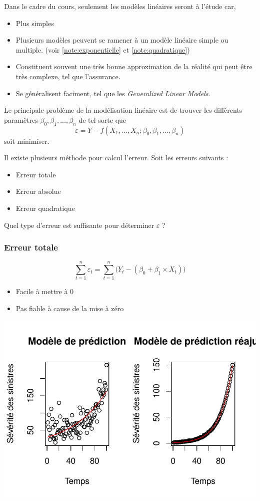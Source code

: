 \documentclass[11pt,french]{report}
\begin{document}
Dans le cadre du cours, seulement les modèles linéaires seront à l'étude car,

\begin{itemize}
\item Plus simples
\item Plusieurs modèles peuvent se ramener à un modèle linéaire simple ou multiple. (voir \ref{note:exponentielle} et \ref{note:quadratique})
\item Constituent souvent une très bonne approximation de la réalité qui peut être très complexe, tel que l'assurance.
\item Se généralisent faciment, tel que les \textit{Generalized Linear Models}.
\end{itemize}

Le principale problème de la modélisation linéaire est de trouver les différents paramètres $\beta_0, \beta_1, ..., \beta_n$ de tel sorte que
\begin{equation}
\varepsilon = Y - f(X_1,...,X_n; \beta_0, \beta_1,...,\beta_n)
\end{equation}
soit minimiser.

Il existe plusieurs méthode pour calcul l'erreur. Soit les erreurs suivants :
\begin{itemize}
\item Erreur totale
\item Erreur absolue
\item Erreur quadratique
\end{itemize}

Quel type d'erreur est suffisante pour déterminer $\varepsilon$ ?

\subsubsection{Erreur totale}
\begin{equation}
\sum_{t=1}^n \varepsilon_t = \sum_{t=1}^n \Big( Y_t - (\beta_0 + \beta_1\times X_t) \Big) 
\end{equation}
\begin{itemize}
\item Facile à mettre à 0
\item Pas fiable à cause de la mise à zéro
\end{itemize}

\includegraphics{notes_de_cours-006}
\end{document}
